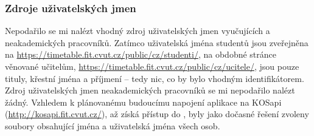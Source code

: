 \subsubsection{Zdroje uživatelských jmen}
Nepodařilo se mi nalézt vhodný zdroj uživatelských jmen vyučujících a neakademických pracovníků. Zatímco uživatelská jména studentů jsou zveřejněna na \url{https://timetable.fit.cvut.cz/public/cz/studenti/}, na obdobné stránce věnované učitelům, \url{https://timetable.fit.cvut.cz/public/cz/ucitele/}, jsou pouze tituly, křestní jména a příjmení -- tedy nic, co by bylo vhodným identifikátorem. Zdroj uživatelských jmen neakademických pracovníků se mi nepodařilo nalézt žádný. Vzhledem k plánovanému budoucímu napojení aplikace na KOSapi (\url{http://kosapi.fit.cvut.cz/}), až získá přístup do , byly jako dočasné řešení zvoleny soubory obsahující jména a uživatelská jména všech osob.

